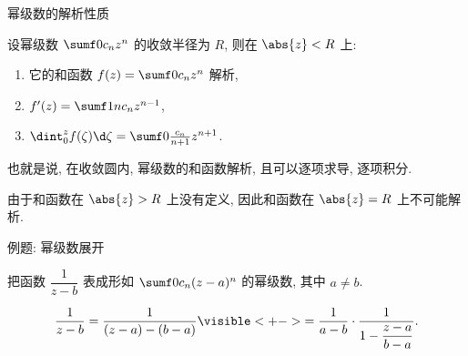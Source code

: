 

\begin{frame}{幂级数的解析性质}
	\onslide<+->
	\begin{theorem}
		设幂级数 $\sumf0 c_nz^n$ 的收敛半径为 $R$, 则在 $\abs{z}<R$ 上:
		\begin{enumerate}
			\item 它的和函数 $f(z)=\sumf0 c_nz^n$ 解析,
			\item $f'(z)=\sumf1 nc_nz^{n-1}$,
			\item $\dint_0^zf(\zeta)\d \zeta=\sumf0 \frac{c_n}{n+1}z^{n+1}$.
		\end{enumerate}
	\end{theorem}

	\onslide<+->
	也就是说, \alert{在收敛圆内, 幂级数的和函数解析, 且可以逐项求导, 逐项积分}.

	\onslide<+->
	由于和函数在 $\abs{z}>R$ 上没有定义, 因此和函数在 $\abs{z}=R$ 上不可能解析.
\end{frame}


\begin{frame}{例题: 幂级数展开}
	\onslide<+->
	\begin{example}[nearnext]
		把函数 $\dfrac1{z-b}$ 表成形如 $\sumf0 c_n(z-a)^n$ 的幂级数, 其中 $a\neq b$.
	\end{example}
	\onslide<+->
	\begin{solution}[nearprev]
		\[
			\frac1{z-b}=\frac1{(z-a)-(b-a)}
			\visible<+->{=\frac1{a-b}\cdot\frac1{1-\dfrac{z-a}{b-a}}.}
		\]
		\bigdel
	\end{solution}
\end{frame}


